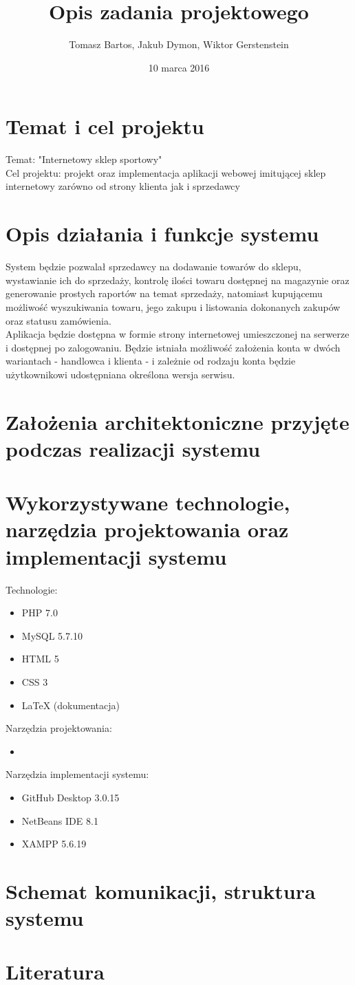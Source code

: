 \documentclass[a4paper, 11pt]{article}
\title{Opis zadania projektowego}
\author{Tomasz Bartos, Jakub Dymon, Wiktor Gerstenstein}
\date{10 marca 2016}
\begin{document}
\maketitle
\section{Temat i cel projektu}
Temat: "Internetowy sklep sportowy"\\
Cel projektu: projekt oraz implementacja aplikacji webowej imitującej sklep internetowy zarówno od strony klienta jak i sprzedawcy
\section{Opis działania i funkcje systemu}
System będzie pozwalał sprzedawcy na dodawanie towarów do sklepu, wystawianie ich do sprzedaży, kontrolę ilości towaru dostępnej na magazynie oraz generowanie prostych raportów na temat sprzedaży, natomiast kupującemu możliwość wyszukiwania towaru, jego zakupu i listowania dokonanych zakupów oraz statusu zamówienia.\\
Aplikacja będzie dostępna w formie strony internetowej umieszczonej na serwerze i dostępnej po zalogowaniu. Będzie istniała możliwość założenia konta w dwóch wariantach - handlowca i klienta - i zależnie od rodzaju konta będzie użytkownikowi udostępniana określona wersja serwisu.
\section{Założenia architektoniczne przyjęte podczas realizacji systemu}
\section{Wykorzystywane technologie, narzędzia projektowania oraz implementacji systemu}
Technologie:
\begin{itemize}
	\item PHP 7.0
	\item MySQL 5.7.10
	\item HTML 5
	\item CSS 3
	\item LaTeX (dokumentacja)
\end{itemize}
Narzędzia projektowania:
\begin{itemize}
	\item %
\end{itemize}
Narzędzia implementacji systemu:
\begin{itemize}
	\item GitHub Desktop 3.0.15
	\item NetBeans IDE 8.1
	\item XAMPP 5.6.19
\end{itemize}
\section{Schemat komunikacji, struktura systemu}
\section{Literatura}
\end{document}
